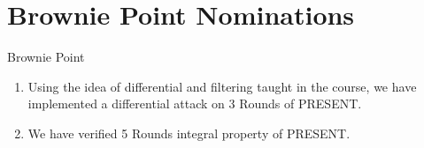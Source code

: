 \section{Brownie Point Nominations}

\begin{frame}{Brownie Point}
   \begin{block}{}
   \begin{enumerate}
    	\item Using the idea of differential and filtering taught in the course, we have implemented a differential attack on 3 Rounds of PRESENT. 
     	\item We have verified 5 Rounds integral property of PRESENT.
   \end{enumerate}
      \end{block}
\end{frame}

